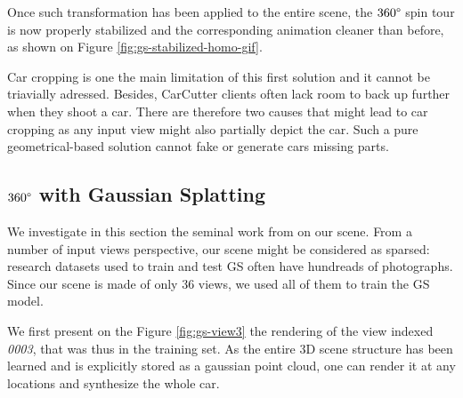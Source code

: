 Once such transformation has been applied to the entire scene, the $360\degree$ spin tour is now properly stabilized and the corresponding animation cleaner than before, as shown on Figure \ref{fig:gs-stabilized-homo-gif}. 

\begin{center}
  \label{fig:gs-stabilized-homo-gif}
\end{center}

Car cropping is one the main limitation of this first solution and it cannot be triavially adressed. Besides, CarCutter clients often lack room to back up further when they shoot a car. There are therefore two causes that might lead to car cropping as any input view might also partially depict the car. Such a pure geometrical-based solution cannot fake or generate cars missing parts. 

\subsection{$360\degree$ with Gaussian Splatting}
\label{subsec:gs-vanilla_gs}
We investigate in this section the seminal work from \citep{kerbl20233d} on our scene. From a number of input views perspective, our scene might be considered as sparsed: research datasets used to train and test \ac{GS} often have hundreads of photographs. Since our scene is made of only 36 views, we used all of them to train the \ac{GS} model. 

We first present on the Figure \ref{fig:gs-view3} the rendering of the view indexed \textit{0003}, that was thus in the training set. As the entire 3D scene structure has been learned and is explicitly stored as a gaussian point cloud, one can render it at any locations and synthesize the whole car. 

